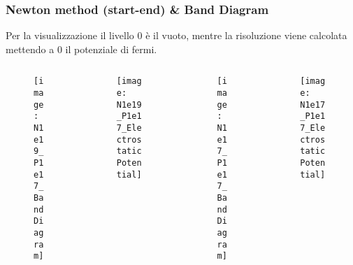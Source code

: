 \begin{frame}
\frametitle{Newton method (start-end) \& Band Diagram}
Per la visualizzazione il livello 0 \`e il vuoto, mentre la risoluzione viene calcolata mettendo a 0 il potenziale di fermi.
\begin{columns}

\begin{column}{0.25 \textwidth}
\begin{center}
\begin{figure}[!h]
          {\texttt{[image: N1e19\_P1e17\_BandDiagram]}}
\end{figure}
\end{center}
\end{column}

\begin{column}{0.25 \textwidth}
\begin{center}
\begin{figure}[!h]
          {\texttt{[image: N1e19\_P1e17\_ElectrostaticPotential]}}	
\end{figure}
\end{center}
\end{column}

\begin{column}{0.25 \textwidth}
\begin{center}
\begin{figure}[!h]

          {\texttt{[image: N1e17\_P1e17\_BandDiagram]}}
 \end{figure}
 \end{center}
 \end{column}
 
\begin{column}{0.25 \textwidth}
\begin{center}
\begin{figure}[!h]
          {\texttt{[image: N1e17\_P1e17\_ElectrostaticPotential]}}	
\end{figure}
\end{center}
\end{column}

\end{columns}

\end{frame}



